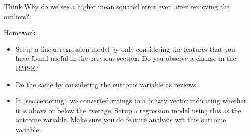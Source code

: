 \documentclass[12pt]{book}\usepackage{knitr}
\begin{document}
\begin{DIY}{Think}
\noindent  Why do we see a higher mean squared error even after removing the outliers?
\end{DIY}

\begin{DIY}{Homework}
\begin{itemize}
  \item Setup a linear regression model by only considering the features that you have found useful in the previous section. Do you observe a change in the RMSE?
  \item Do the same by considering the outcome variable as reviews
  \item In \ref{sec:centering}, we converted ratings to a binary vector indicating whether it is above or below
  the average. Setup a regression model using this as the outcome variable. Make sure you do feature analysis wrt this outcome variable. 
\end{itemize}
\end{DIY}


\newpage

\end{document}
